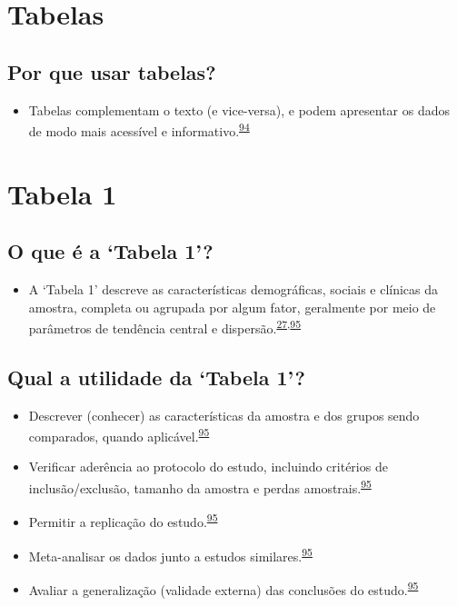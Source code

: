\documentclass[
  a4paper,
]{book}
\providecommand{\tightlist}{%
  \setlength{\itemsep}{0pt}\setlength{\parskip}{0pt}}
\begin{document}
\hypertarget{tabelas}{%
\section{Tabelas}\label{tabelas}}

\hypertarget{por-que-usar-tabelas}{%
\subsection{Por que usar tabelas?}\label{por-que-usar-tabelas}}

\begin{itemize}
\tightlist
\item
  Tabelas complementam o texto (e vice-versa), e podem apresentar os dados de modo mais acessível e informativo.\textsuperscript{\protect\hyperlink{ref-Inskip2017}{94}}
\end{itemize}

\hypertarget{tabela-1}{%
\section{Tabela 1}\label{tabela-1}}

\hypertarget{o-que-uxe9-a-tabela-1}{%
\subsection{O que é a `Tabela 1'?}\label{o-que-uxe9-a-tabela-1}}

\begin{itemize}
\tightlist
\item
  A `Tabela 1' descreve as características demográficas, sociais e clínicas da amostra, completa ou agrupada por algum fator, geralmente por meio de parâmetros de tendência central e dispersão.\textsuperscript{\protect\hyperlink{ref-Westreich2013}{27},\protect\hyperlink{ref-chen2020}{95}}
\end{itemize}

\hypertarget{qual-a-utilidade-da-tabela-1}{%
\subsection{Qual a utilidade da `Tabela 1'?}\label{qual-a-utilidade-da-tabela-1}}

\begin{itemize}
\item
  Descrever (conhecer) as características da amostra e dos grupos sendo comparados, quando aplicável.\textsuperscript{\protect\hyperlink{ref-chen2020}{95}}
\item
  Verificar aderência ao protocolo do estudo, incluindo critérios de inclusão/exclusão, tamanho da amostra e perdas amostrais.\textsuperscript{\protect\hyperlink{ref-chen2020}{95}}
\item
  Permitir a replicação do estudo.\textsuperscript{\protect\hyperlink{ref-chen2020}{95}}
\item
  Meta-analisar os dados junto a estudos similares.\textsuperscript{\protect\hyperlink{ref-chen2020}{95}}
\item
  Avaliar a generalização (validade externa) das conclusões do estudo.\textsuperscript{\protect\hyperlink{ref-chen2020}{95}}
\end{itemize}
\end{document}
